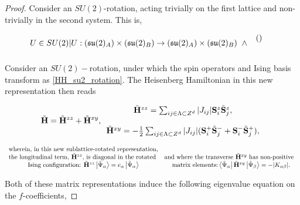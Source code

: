 \documentclass{homework}
\begin{document}
\begin{proof}

Consider an $SU(2)$-rotation, acting trivially on the first lattice and non-trivially in the second system. This is,

$$
    U \in SU(2) | U: (\mathfrak{s}\mathfrak{u}(2)_A) \times (\mathfrak{s}\mathfrak{u}(2)_B) \rightarrow (\mathfrak{s}\mathfrak{u}(2)_A) \times (\mathfrak{s}\mathfrak{u}(2)_B) \textnormal{ } \land \textnormal{ } \begin{array}{cc}
        () &  \\
         & 
    \end{array}
$$

Consider an $SU(2)-$rotation, under which the spin operators and Ising basis transform as \cref{HH_su2_rotation}. The Heisenberg Hamiltonian in this new representation then reads 

\begin{equation}
    \tilde{{\bf H}} = \tilde{{\bf H}}^{zz} + \tilde{{\bf H}}^{xy}, \begin{array}{c}
        \tilde{{\bf H}}^{zz} = \sum_{ij \in \Lambda \subset Z^{d}} |J_{ij}| {\bf S}_i^z \tilde{{\bf S}}_j^z, \\  
         \\
        \tilde{{\bf H}}^{xy} = - \frac{1}{2} \sum_{ij \in \Lambda \subset Z^{d}} |J_{ij}| ({\bf S}_i^+ \tilde{{\bf S}}_j^- + {\bf S}_i^- \tilde{{\bf S}}_j^+), \\  
    \end{array}
    \label{auerbach's HH hamiltonian}
\end{equation}

\begin{equation*}
    \begin{array}{cc}
    \textnormal{wherein, in this new sublattice-rotated representation,} \\
        \textnormal{the longitudinal term, $\tilde{{\bf H}}^{zz}$, is diagonal in the rotated } & \textnormal{and where the transverse $\tilde{{\bf H}}^{xy}$ has non-positive } \\
        \textnormal{Ising configuration: } \tilde{{\bf H}}^{zz}\ket{\tilde{\Psi}_{\alpha}} = e_{\alpha} \ket{\tilde{\Psi}_{\alpha}} & \textnormal{ matrix elements:} 
        \bra{\tilde{\Psi}_{\alpha}} \tilde{{\bf H}}^{xy}  \ket{\tilde{\Psi}_{\beta}} = -|K_{\alpha \beta}|. \\
    \end{array}
\end{equation*}

Both of these matrix representations induce the following eigenvalue equation on the $f$-coefficients, 


\end{proof}
\end{document}
